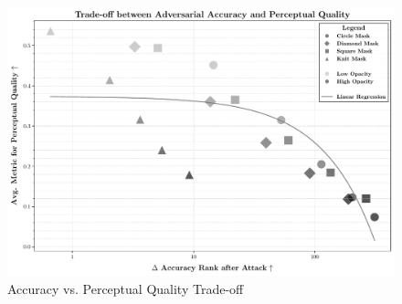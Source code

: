 \documentclass[a4paper, oneside]{discothesis}
\begin{document}
\begin{figure}
	\centering
	\includegraphics[width=1\columnwidth]{figures/eval_cls_generalizability.pdf}
	\caption{Accuracy vs. Perceptual Quality Trade-off}
	\label{fig:accpercept}
\end{figure}
\end{document}
